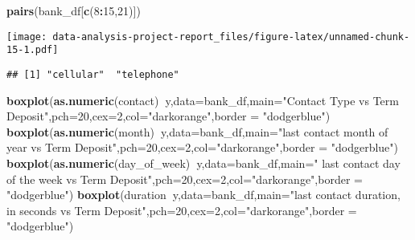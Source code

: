 \documentclass[
]{article}
\newenvironment{Shaded}{\begin{snugshade}}{\end{snugshade}}
\newcommand{\DataTypeTok}[1]{\textcolor[rgb]{0.13,0.29,0.53}{#1}}
\newcommand{\DecValTok}[1]{\textcolor[rgb]{0.00,0.00,0.81}{#1}}
\newcommand{\KeywordTok}[1]{\textcolor[rgb]{0.13,0.29,0.53}{\textbf{#1}}}
\newcommand{\NormalTok}[1]{#1}
\newcommand{\OperatorTok}[1]{\textcolor[rgb]{0.81,0.36,0.00}{\textbf{#1}}}
\newcommand{\StringTok}[1]{\textcolor[rgb]{0.31,0.60,0.02}{#1}}
\begin{document}
\begin{Shaded}
\begin{Highlighting}[]
\KeywordTok{pairs}\NormalTok{(bank_df[}\KeywordTok{c}\NormalTok{(}\DecValTok{8}\OperatorTok{:}\DecValTok{15}\NormalTok{,}\DecValTok{21}\NormalTok{)])}
\end{Highlighting}
\end{Shaded}

\texttt{[image: data-analysis-project-report\_files/figure-latex/unnamed-chunk-15-1.pdf]}

\begin{Shaded}
\end{Shaded}

\begin{verbatim}
## [1] "cellular"  "telephone"
\end{verbatim}

\begin{Shaded}
\begin{Highlighting}[]
\KeywordTok{boxplot}\NormalTok{(}\KeywordTok{as.numeric}\NormalTok{(contact)}\OperatorTok{~}\NormalTok{y,}\DataTypeTok{data=}\NormalTok{bank_df,}\DataTypeTok{main=}\StringTok{"Contact Type vs Term Deposit"}\NormalTok{,}\DataTypeTok{pch=}\DecValTok{20}\NormalTok{,}\DataTypeTok{cex=}\DecValTok{2}\NormalTok{,}\DataTypeTok{col=}\StringTok{"darkorange"}\NormalTok{,}\DataTypeTok{border =} \StringTok{"dodgerblue"}\NormalTok{)}
\KeywordTok{boxplot}\NormalTok{(}\KeywordTok{as.numeric}\NormalTok{(month)}\OperatorTok{~}\NormalTok{y,}\DataTypeTok{data=}\NormalTok{bank_df,}\DataTypeTok{main=}\StringTok{"last contact month of year vs Term Deposit"}\NormalTok{,}\DataTypeTok{pch=}\DecValTok{20}\NormalTok{,}\DataTypeTok{cex=}\DecValTok{2}\NormalTok{,}\DataTypeTok{col=}\StringTok{"darkorange"}\NormalTok{,}\DataTypeTok{border =} \StringTok{"dodgerblue"}\NormalTok{)}
\KeywordTok{boxplot}\NormalTok{(}\KeywordTok{as.numeric}\NormalTok{(day_of_week)}\OperatorTok{~}\NormalTok{y,}\DataTypeTok{data=}\NormalTok{bank_df,}\DataTypeTok{main=}\StringTok{" last contact day of the week vs Term Deposit"}\NormalTok{,}\DataTypeTok{pch=}\DecValTok{20}\NormalTok{,}\DataTypeTok{cex=}\DecValTok{2}\NormalTok{,}\DataTypeTok{col=}\StringTok{"darkorange"}\NormalTok{,}\DataTypeTok{border =} \StringTok{"dodgerblue"}\NormalTok{)}
\KeywordTok{boxplot}\NormalTok{(duration}\OperatorTok{~}\NormalTok{y,}\DataTypeTok{data=}\NormalTok{bank_df,}\DataTypeTok{main=}\StringTok{"last contact duration, in seconds vs Term Deposit"}\NormalTok{,}\DataTypeTok{pch=}\DecValTok{20}\NormalTok{,}\DataTypeTok{cex=}\DecValTok{2}\NormalTok{,}\DataTypeTok{col=}\StringTok{"darkorange"}\NormalTok{,}\DataTypeTok{border =} \StringTok{"dodgerblue"}\NormalTok{)}
\end{Highlighting}
\end{Shaded}
\end{document}
